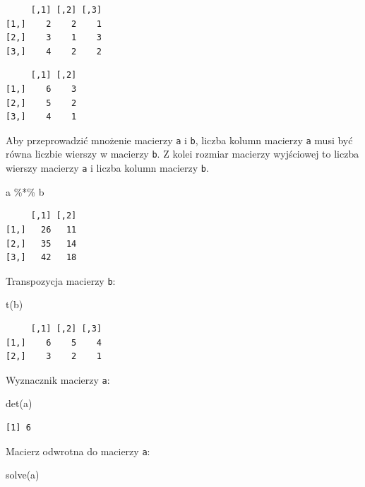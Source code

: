 \documentclass[
  letterpaper,
  DIV=11,
  numbers=noendperiod]{scrreprt}
\newenvironment{Shaded}{\begin{snugshade}}{\end{snugshade}}
\newcommand{\FunctionTok}[1]{\textcolor[rgb]{0.28,0.35,0.67}{#1}}
\newcommand{\NormalTok}[1]{\textcolor[rgb]{0.00,0.23,0.31}{#1}}
\newcommand{\SpecialCharTok}[1]{\textcolor[rgb]{0.37,0.37,0.37}{#1}}
\begin{document}
\begin{verbatim}
     [,1] [,2] [,3]
[1,]    2    2    1
[2,]    3    1    3
[3,]    4    2    2
\end{verbatim}

\begin{verbatim}
     [,1] [,2]
[1,]    6    3
[2,]    5    2
[3,]    4    1
\end{verbatim}

Aby przeprowadzić mnożenie macierzy \texttt{a} i \texttt{b}, liczba
kolumn macierzy \texttt{a} musi być równa liczbie wierszy w macierzy
\texttt{b}. Z kolei rozmiar macierzy wyjściowej to liczba wierszy
macierzy \texttt{a} i liczba kolumn macierzy \texttt{b}.

\begin{Shaded}
\begin{Highlighting}[]
\NormalTok{a }\SpecialCharTok{\%*\%}\NormalTok{ b}
\end{Highlighting}
\end{Shaded}

\begin{verbatim}
     [,1] [,2]
[1,]   26   11
[2,]   35   14
[3,]   42   18
\end{verbatim}

Transpozycja macierzy \texttt{b}:

\begin{Shaded}
\begin{Highlighting}[]
\FunctionTok{t}\NormalTok{(b)}
\end{Highlighting}
\end{Shaded}

\begin{verbatim}
     [,1] [,2] [,3]
[1,]    6    5    4
[2,]    3    2    1
\end{verbatim}

Wyznacznik macierzy \texttt{a}:

\begin{Shaded}
\begin{Highlighting}[]
\FunctionTok{det}\NormalTok{(a)}
\end{Highlighting}
\end{Shaded}

\begin{verbatim}
[1] 6
\end{verbatim}

Macierz odwrotna do macierzy \texttt{a}:

\begin{Shaded}
\begin{Highlighting}[]
\FunctionTok{solve}\NormalTok{(a)}
\end{Highlighting}
\end{Shaded}
\end{document}
